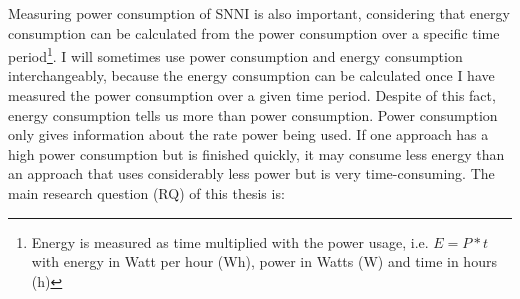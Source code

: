 \documentclass[../thesis.tex]{subfiles}
\begin{document}


Measuring power consumption of SNNI is also important, considering that energy consumption can be calculated from the power consumption over a specific time period\footnote{Energy is measured as time multiplied with the power usage, i.e. $E=P*t$ with energy in Watt per hour (Wh), power in Watts (W) and time in hours (h)}. I will sometimes use power consumption and energy consumption interchangeably, because the energy consumption can be calculated once I have measured the power consumption over a given time period. Despite of this fact, energy consumption tells us more than power consumption. Power consumption only gives information about the rate power being used. If one approach has a high power consumption but is finished quickly, it may consume less energy than an approach that uses considerably less power but is very time-consuming. The main research question (RQ) of this thesis is:
\end{document}

